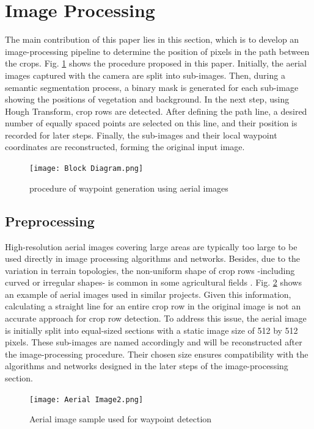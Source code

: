 \documentclass[conference]{IEEEtran}
\begin{document}
\section{Image Processing}\label{Image Processing}
The main contribution of this paper lies in this section, which is to develop an image-processing pipeline to determine the position of pixels in the path between the crops. Fig.
\ref{fig_procedure}
shows the procedure proposed in this paper. Initially, the aerial images captured with the camera are split into sub-images. Then, during a semantic segmentation process, a binary mask is generated for each sub-image showing the positions of vegetation and background. In the next step, using Hough Transform, crop rows are detected. After defining the path line, a desired number of equally spaced points are selected on this line, and their position is recorded for later steps. Finally, the sub-images and their local waypoint coordinates are reconstructed, forming the original input image.

\begin{figure}[t]
\texttt{[image: Block Diagram.png]}
\caption{procedure of waypoint generation using aerial images
\cite{b5}}
\label{fig_procedure}
\end{figure}

\subsection{Preprocessing}\label{Preprocessing}
High-resolution aerial images covering large areas are typically too large to be used directly in image processing algorithms and networks.
Besides, due to the variation in terrain topologies, the non-uniform shape of crop rows -including curved or irregular shapes- is common in some agricultural fields
\cite{b2, b3, b14}.
Fig. \ref{fig_Aerial} shows an example of aerial images used in similar projects.
Given this information, calculating a straight line for an entire crop row in the original image is not an accurate approach for crop row detection.
To address this issue, the aerial image is initially split into equal-sized sections with a static image size of 512 by 512 pixels. These sub-images are named accordingly and will be reconstructed after the image-processing procedure. Their chosen size ensures compatibility with the algorithms and networks designed in the later steps of the image-processing section.


\begin{figure}[t]
\texttt{[image: Aerial Image2.png]}
\caption{Aerial image sample used for waypoint detection
\cite{b5}}
\label{fig_Aerial}
\end{figure}
\end{document}
